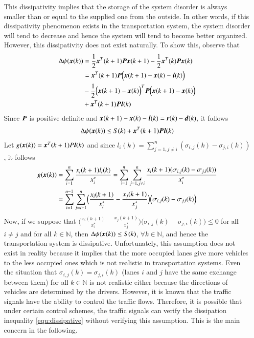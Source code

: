 \documentclass[preprint,authoryear,12pt]{elsarticle}
\renewcommand{\vec}[1]{\mbox{\boldmath$#1$}}
\newcommand{\mat}[1]{\mbox{\boldmath$#1$}}
\begin{document}
This dissipativity implies that the storage of the system disorder is
always smaller than or equal to the supplied one from the outside. In
other words, if this dissipativity phenomenon exists in the
transportation system, the system disorder will tend to decrease and
hence the system will tend to become better organized. 
However, this dissipativity does not exist naturally. To show this, 
observe that 
\begin{align*}
\Delta\psi(\vec{x}(k))
&=\frac{1}{2}\vec{x}^T(k+1)\mat{P}\vec{x}(k+1)
-\frac{1}{2}\vec{x}^T(k)\mat{P}\vec{x}(k)\\
&=\vec{x}^T(k+1)\mat{P}
\Bigl(\vec{x}(k+1)-\vec{x}(k)-\vec{l}(k)\Bigr)\\
&-\frac{1}{2}\Bigl(\vec{x}(k+1)-\vec{x}(k)\Bigr)^T
\mat{P}\Bigl(\vec{x}(k+1)-\vec{x}(k)\Bigr)\\
&+\vec{x}^T(k+1)\mat{P}\vec{l}(k)\\
\end{align*}
Since $\mat{P}$ is positive definite and
$\vec{x}(k+1)-\vec{x}(k)-\vec{l}(k)=\vec{r}(k)-\vec{d}(k)$, it follows
\begin{equation}\label{equ:dissipative1}
\Delta\psi(\vec{x}(k))\leq S(k)+\vec{x}^T(k+1)\mat{P}\vec{l}(k)
\end{equation}
Let $g(\vec{x}(k))=\vec{x}^T(k+1)P\vec{l}(k)$ and since
$l_i(k)=\sum_{j=1,j\neq i}^{n}(\sigma_{i,j}(k)-\sigma_{j,i}(k))$, it
follows
\begin{align}\label{eq:g}
g(\vec{x}(k))&=\sum_{i=1}^{n}
\frac{x_i(k+1)l_i(k)}{x_i^*}=
\sum_{i=1}^{n}\sum_{j=1,j\neq i}^{n}
\frac{x_i(k+1)(\sigma_{i,j}(k)-\sigma_{j,i}(k))}{x_i^*}
\nonumber\\
&=\sum_{i=1}^{n-1}\sum_{j=i+1}^{n}
\Bigl(\frac{x_i(k+1)}{x_i^*}-\frac{x_j(k+1)}{x_j^*}\Bigr)
\Bigl(\sigma_{i,j}(k)-\sigma_{j,i}(k)\Bigl)\nonumber\\
 \end{align}
Now, if we suppose that
$\bigl(\frac{x_i(k+1)}{x_i^*}-\frac{x_j(k+1)}{x_j^*}\bigr)
\bigl(\sigma_{i,j}(k)-\sigma_{j,i}(k)\bigl)\le 0$ for all $i\neq j$
and for all $k\in\mathbb{N}$,
then $\Delta\psi(\vec{x}(k)) \leq S(k)$, $\forall k\in\mathbb{N}$, and
hence the transportation system is dissipative. Unfortunately, this 
assumption does not exist in reality because it implies that the more
occupied lanes give  more vehicles to the less occupied ones which is
not realistic in transportation systems. Even the situation that
$\sigma_{i,j}(k)=\sigma_{j,i}(k)$ (lanes $i$ and $j$ have the same  
exchange between them) for all $k\in\mathbb{N}$ is not realistic
either because the directions of vehicles are determined by the
drivers. However, it is known that the traffic signals have the
ability to control the traffic flows.
Therefore, it is possible that under certain control schemes, the
traffic signals can verify the dissipation inequality
\eqref{equ:dissipative} without verifying this assumption. This is the
main concern in the following.
\end{document}

